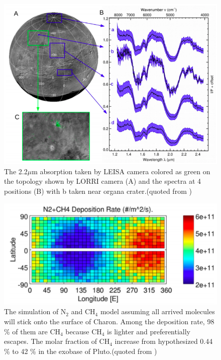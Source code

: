 \begin{figure}
\centering
\includegraphics[width=\textwidth]{figures/chapter1/IR.png}
\caption{The 2.2$\mu$m absorption taken by LEISA camera colored as green on the topology shown by LORRI camera (A) and the spectra at 4 positions (B) with b taken near organa crater.(quoted from \cite{grundy2016surface})}
\label{fig:Charon_IR}
\end{figure}

\begin{figure}
\centering
\includegraphics[width=\textwidth]{figures/chapter1/methane.png}
\caption{The simulation of N$_2$ and CH$_4$ model assuming all arrived molecules will stick onto the surface of Charon. Among the deposition rate, 98 \% of them are CH$_4$ because CH$_4$ is lighter and preferentially escapes. The molar fraction of CH$_4$ increase from hypothesized 0.44 \% to 42 \% in the exobase of Pluto.(quoted from \cite{hoey2017rarefied})}
\label{fig:Charon_distribution}
\end{figure}

